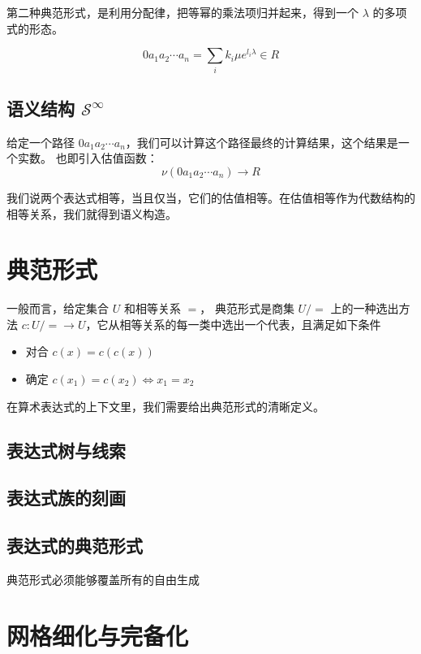 \documentclass[a4paper,12pt]{article}
\numberwithin{definition}{section}
\numberwithin{lemma}{section}
\numberwithin{proposition}{section}
\numberwithin{theorem}{section}
\numberwithin{grammar}{section}
\numberwithin{program}{section}
\numberwithin{convention}{section}
\numberwithin{corollary}{section}
\begin{document}
第二种典范形式，是利用分配律，把等幂的乘法项归并起来，得到一个 $\lambda$ 的多项式的形态。

$$
0 a_1 a_2 \cdots a_n = \sum_{i} k_i \mu e^{l_i \lambda} \in R
$$

\subsection{语义结构 $\mathcal{S}^\infty$}\label{subsec:semantical}

给定一个路径 $ 0 a_1 a_2 \cdots a_n $，我们可以计算这个路径最终的计算结果，这个结果是一个实数。
也即引入估值函数：
$$
\nu(0 a_1 a_2 \cdots a_n) \to R
$$

我们说两个表达式相等，当且仅当，它们的估值相等。在估值相等作为代数结构的相等关系，我们就得到语义构造。

\newpage

\section{典范形式}\label{sec:canonical}

一般而言，给定集合 $U$ 和相等关系 $=$， 典范形式是商集 $U/=$ 上的一种选出方法 $c: U/= \to U$，它从相等关系的每一类中选出一个代表，且满足如下条件

\begin{itemize}
    \item 对合 $  c(x) = c(c(x)) $
    \item 确定 $  c(x_1) = c(x_2) \iff x_1 = x_2  $
\end{itemize}

在算术表达式的上下文里，我们需要给出典范形式的清晰定义。

\subsection{表达式树与线索}



\subsection{表达式族的刻画}

\subsection{表达式的典范形式}

典范形式必须能够覆盖所有的自由生成

\newpage

\section{网格细化与完备化}\label{subsec:completeness}
\end{document}
